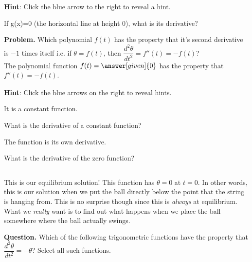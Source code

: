 \documentclass[handout,nooutcomes]{ximera}
\begin{document}
\begin{example}
\begin{explanation}
\textbf{Hint}: Click the blue arrow to the right to reveal a hint.
\begin{expandable}
If g(x)=0 (the horizontal line at height 0), what is its derivative?
\end{expandable}


\textbf{Problem. } Which polynomial $f(t)$ has the property that it's second
derivative is $-1$ times itself i.e. if
$\theta=f(t)$, then $\dfrac{d^2 \theta}{d t^2} = f''(t) = -f(t)$?\\


The polynomial function $f(t) = \answer[given]{0}$ has the property that $f''(t) = -f(t)$.\\

$\phantom{.}$\\
\medskip

\textbf{Hint}: Click the blue arrows on the right to reveal hints.\\

\begin{expandable}
It is a constant function.
\begin{expandable}
What is the derivative of a constant function?
\begin{expandable}
The function is its own derivative.
\begin{expandable}
What is the derivative of the zero function?
\end{expandable}
\end{expandable}
\end{expandable}
\end{expandable}

$\phantom{.}$\\
\medskip


This is our equilibrium solution! This function has $\theta=0$ at $t=0$. In other
words, this is our solution when we put the ball directly below the point
that the string is hanging from. This is no surprise though since this
is \textit{always} at equilibrium. What we \emph{really} want is to find out what happens
when we place the ball somewhere where the ball actually swings.


\textbf{Question.}  Which of the following trigonometric functions have the property that
$\dfrac{d^2 \theta}{d t^2} = -\theta$? Select all such functions.
\begin{selectAll}
\end{selectAll}
$\phantom{.}$
\medskip



\end{explanation}
\end{example}
\end{document}
